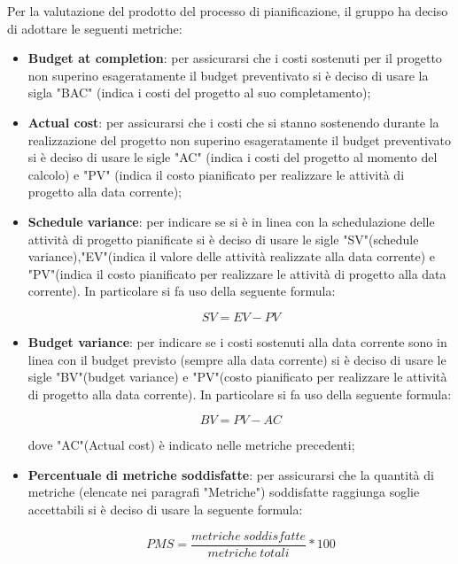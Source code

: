 Per la valutazione del prodotto del processo di pianificazione, il gruppo ha deciso di adottare le seguenti metriche:
\begin{itemize}
\item \textbf{Budget at completion}: per assicurarsi che i costi sostenuti per il progetto non superino esageratamente il budget preventivato si è deciso di usare la sigla "BAC" (indica i costi del progetto al suo completamento);
\item \textbf{Actual cost}: per assicurarsi che i costi che si stanno sostenendo durante la realizzazione del progetto non superino esageratamente il budget preventivato si è deciso di usare le sigle "AC" (indica i costi del progetto al momento del calcolo) e "PV" (indica il costo pianificato per realizzare le attività di progetto alla data corrente);
\item \textbf{Schedule variance}: per indicare se si è in linea con la schedulazione delle attività di progetto pianificate si è deciso di usare le sigle "SV"(schedule variance),"EV"(indica il valore delle attività realizzate alla data corrente) e "PV"(indica il costo pianificato per realizzare le attività di progetto alla data corrente). In particolare si fa uso della seguente formula: \vspace{-0.5cm}
\begin{center}
\[SV=EV-PV\]
\end{center}
\item \textbf{Budget variance}: per indicare se i costi sostenuti alla data corrente sono in linea con il budget previsto (sempre alla data corrente) si è deciso di usare le sigle "BV"(budget variance) e "PV"(costo pianificato per realizzare le attività di progetto alla data corrente).  In particolare si fa uso della seguente formula: \vspace{-0.5cm}
\begin{center}
\[BV=PV-AC\]
\end{center}
dove "AC"(Actual cost) è indicato nelle metriche precedenti;
\item \textbf{Percentuale di metriche soddisfatte}: per assicurarsi che la quantità di metriche (elencate nei paragrafi "Metriche") soddisfatte raggiunga soglie accettabili si è deciso di usare la seguente formula:
\begin{center}
\[PMS=\frac{metriche \ soddisfatte}{metriche \ totali}*100\]
\end{center}
\end{itemize}


